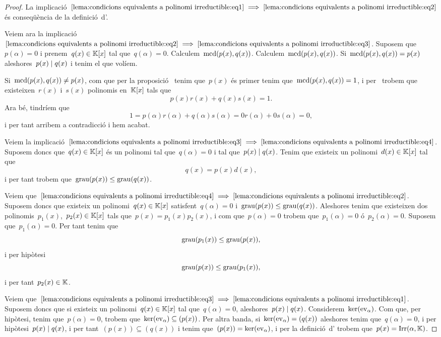 \documentclass[../Apunts.tex]{subfiles}
\begin{document}
	\begin{proof}
		La implicació~\(\eqref{lema:condicions equivalents a polinomi irreductible:eq1}\implies\eqref{lema:condicions equivalents a polinomi irreductible:eq2}\) és conseqüència de la definició~d'.
		
		Veiem ara la implicació~\(\eqref{lema:condicions equivalents a polinomi irreductible:eq2}\implies\eqref{lema:condicions equivalents a polinomi irreductible:eq3}\). Suposem que~\(p(\alpha)=0\) i prenem~\(q(x)\in\mathbb{K}[x]\) tal que~\(q(\alpha)=0\). Calculem~\(\operatorname{mcd}(p(x),q(x))\). Calculem~\(\operatorname{mcd}(p(x),q(x))\). Si~\(\operatorname{mcd}(p(x),q(x))=p(x)\) aleshores~\(p(x)\mathrel{|} q(x)\) i tenim el que volíem.
		
		Si~\(\operatorname{mcd}(p(x),q(x))\neq p(x)\), com que per la proposició~ tenim que~\(p(x)\) és primer tenim que~\(\operatorname{mcd}(p(x),q(x))=1\), i per~ trobem que existeixen~\(r(x)\) i~\(s(x)\) polinomis en~\(\mathbb{K}[x]\) tals que
		\[p(x)r(x)+q(x)s(x)=1.\]
		Ara bé, tindríem que
		\[
			1=p(\alpha)r(\alpha)+q(\alpha)s(\alpha)=0r(\alpha)+0s(\alpha)=0,
		\]
		i per tant arribem a contradicció i hem acabat.
		
		Veiem la implicació~\(\eqref{lema:condicions equivalents a polinomi irreductible:eq3}\implies\eqref{lema:condicions equivalents a polinomi irreductible:eq4}\). Suposem doncs que~\(q(x)\in\mathbb{K}[x]\) és un polinomi tal que~\(q(\alpha)=0\) i tal que~\(p(x)\mathrel{|} q(x)\). Tenim que existeix un polinomi~\(d(x)\in\mathbb{K}[x]\) tal que
		\[q(x)=p(x)d(x),\]
		i per tant trobem que~\(\operatorname{grau}(p(x))\leq\operatorname{grau}(q(x))\).
		
		Veiem que~\(\eqref{lema:condicions equivalents a polinomi irreductible:eq4}\implies\eqref{lema:condicions equivalents a polinomi irreductible:eq2}\). Suposem doncs que existeix un polinomi~\(q(x)\in\mathbb{K}[x]\) satisfent~\(q(\alpha)=0\) i~\(\operatorname{grau}(p(x))\leq\operatorname{grau}(q(x))\). Aleshores tenim que existeixen dos polinomis~\(p_{1}(x)\),~\(p_{2}(x)\in\mathbb{K}[x]\) tals que~\(p(x)=p_{1}(x)p_{2}(x)\), i com que~\(p(\alpha)=0\) trobem que~\(p_{1}(\alpha)=0\) ó~\(p_{2}(\alpha)=0\). Suposem que~\(p_{1}(\alpha)=0\). Per tant tenim que
		\[\operatorname{grau}(p_{1}(x))\leq\operatorname{grau}(p(x)),\]
		i per hipòtesi
		\[\operatorname{grau}(p(x))\leq\operatorname{grau}(p_{1}(x)),\]
		i per tant~\(p_{2}(x)\in\mathbb{K}\).
		
		Veiem que~\(\eqref{lema:condicions equivalents a polinomi irreductible:eq3}\implies\eqref{lema:condicions equivalents a polinomi irreductible:eq1}\). Suposem doncs que si existeix un polinomi~\(q(x)\in\mathbb{K}[x]\) tal que~\(q(\alpha)=0\), aleshores~\(p(x)\mathrel{|} q(x)\). Considerem~\(\operatorname{ker}(\mathrm{ev}_{\alpha})\). Com que, per hipòtesi, tenim que~\(p(\alpha)=0\), trobem que~\(\operatorname{ker}(\mathrm{ev}_{\alpha})\subseteq(p(x))\). Per altra banda, si~\(\operatorname{ker}(\mathrm{ev}_{\alpha})=(q(x))\) aleshores tenim que~\(q(\alpha)=0\), i per hipòtesi~\(p(x)\mathrel{|} q(x)\), i per tant~\((p(x))\subseteq(q(x))\) i tenim que~\((p(x))=\operatorname{ker}(\mathrm{ev}_{\alpha})\), i per la definició~d' trobem que~\(p(x)=\operatorname{Irr}(\alpha,\mathbb{K})\).
	\end{proof}
\end{document}
